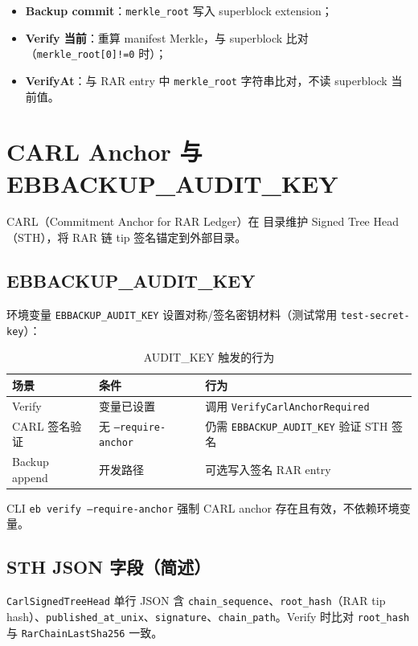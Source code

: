\begin{itemize}[nosep]
  \item \textbf{Backup commit}：\texttt{merkle\_root} 写入 superblock extension；
  \item \textbf{Verify 当前}：重算 manifest Merkle，与 superblock 比对（\texttt{merkle\_root[0]!=0} 时）；
  \item \textbf{VerifyAt}：与 RAR entry 中 \texttt{merkle\_root} 字符串比对，不读 superblock 当前值。
\end{itemize}

\section{CARL Anchor 与 EBBACKUP\_AUDIT\_KEY}

CARL（Commitment Anchor for RAR Ledger）在  目录维护 Signed Tree Head（STH），将 RAR 链 tip 签名锚定到外部目录。

\subsection{EBBACKUP\_AUDIT\_KEY}

环境变量 \texttt{EBBACKUP\_AUDIT\_KEY} 设置对称/签名密钥材料（测试常用 \texttt{test-secret-key}）：

\begin{table}[htbp]
\centering
\caption{AUDIT\_KEY 触发的行为}
\begin{tabular}{@{}llp{6.5cm}@{}}
\toprule
场景 & 条件 & 行为 \\
\midrule
Verify & 变量已设置 & 调用 \texttt{VerifyCarlAnchorRequired} \\
CARL 签名验证 & 无 \texttt{--require-anchor} & 仍需 \texttt{EBBACKUP\_AUDIT\_KEY} 验证 STH 签名 \\
Backup append & 开发路径 & 可选写入签名 RAR entry \\
\bottomrule
\end{tabular}
\end{table}

CLI \texttt{eb verify --require-anchor} 强制 CARL anchor 存在且有效，不依赖环境变量。

\subsection{STH JSON 字段（简述）}

\texttt{CarlSignedTreeHead} 单行 JSON 含 \texttt{chain\_sequence}、\texttt{root\_hash}（RAR tip hash）、\texttt{published\_at\_unix}、\texttt{signature}、\texttt{chain\_path}。Verify 时比对 \texttt{root\_hash} 与 \texttt{RarChainLastSha256} 一致。

